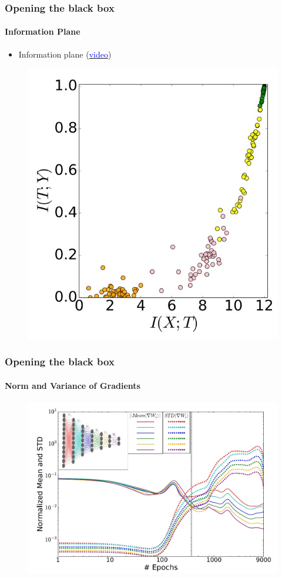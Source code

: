 \documentclass[10pt]{beamer}
\begin{document}
\begin{frame}
\frametitle{Opening the black box}
\framesubtitle{Information Plane}
\begin{itemize}
\item Information plane (\href{https://youtu.be/XL07WEc2TRI?t=1333}{\textcolor{blue}{video}})
\end{itemize}
\begin{figure}
\centering
\vspace*{-1.8mm}
\includegraphics[scale=0.28]{figs/initial-information-plane.jpeg}
\end{figure}
\end{frame}

\begin{frame}
\frametitle{Opening the black box}
\framesubtitle{Norm and Variance of Gradients}
\begin{figure}
\centering
\includegraphics[scale=0.3]{figs/gradients.jpeg}
\end{figure}
\end{frame}
\end{document}
